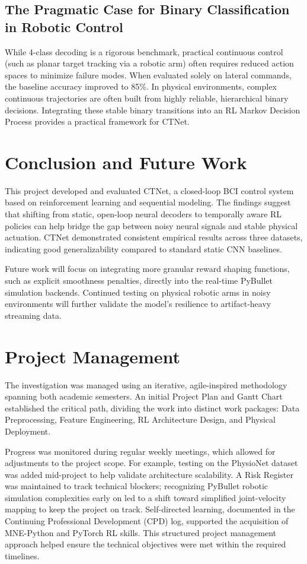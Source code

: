 \documentclass[12pt, a4paper]{article}
\begin{document}
\subsection{The Pragmatic Case for Binary Classification in Robotic Control}

While 4-class decoding is a rigorous benchmark, practical continuous control (such as planar target tracking via a robotic arm) often requires reduced action spaces to minimize failure modes. When evaluated solely on lateral commands, the baseline accuracy improved to 85\%. In physical environments, complex continuous trajectories are often built from highly reliable, hierarchical binary decisions. Integrating these stable binary transitions into an RL Markov Decision Process provides a practical framework for CTNet.

\section{Conclusion and Future Work}

This project developed and evaluated CTNet, a closed-loop BCI control system based on reinforcement learning and sequential modeling. The findings suggest that shifting from static, open-loop neural decoders to temporally aware RL policies can help bridge the gap between noisy neural signals and stable physical actuation. CTNet demonstrated consistent empirical results across three datasets, indicating good generalizability compared to standard static CNN baselines. 

Future work will focus on integrating more granular reward shaping functions, such as explicit smoothness penalties, directly into the real-time PyBullet simulation backends. Continued testing on physical robotic arms in noisy environments will further validate the model's resilience to artifact-heavy streaming data.

\section{Project Management}

The investigation was managed using an iterative, agile-inspired methodology spanning both academic semesters. An initial Project Plan and Gantt Chart established the critical path, dividing the work into distinct work packages: Data Preprocessing, Feature Engineering, RL Architecture Design, and Physical Deployment. 

Progress was monitored during regular weekly meetings, which allowed for adjustments to the project scope. For example, testing on the PhysioNet dataset was added mid-project to help validate architecture scalability. A Risk Register was maintained to track technical blockers; recognizing PyBullet robotic simulation complexities early on led to a shift toward simplified joint-velocity mapping to keep the project on track. Self-directed learning, documented in the Continuing Professional Development (CPD) log, supported the acquisition of MNE-Python and PyTorch RL skills. This structured project management approach helped ensure the technical objectives were met within the required timelines.
\end{document}
